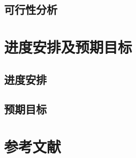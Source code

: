		\subsection{可行性分析} %
		\label{sub:可行性分析}
		
	\newpage
	\section{进度安排及预期目标} %
	\label{sec:进度安排及预期目标}
		\subsection{进度安排} %
		\label{sub:进度安排}
		
		\subsection{预期目标} %
		\label{sub:预期目标}
		
	\newpage
	\section*{参考文献} %
	\label{sec:参考文献2}
		\begingroup
		    \setlength{\bibsep}{0pt}
		\endgroup
	

